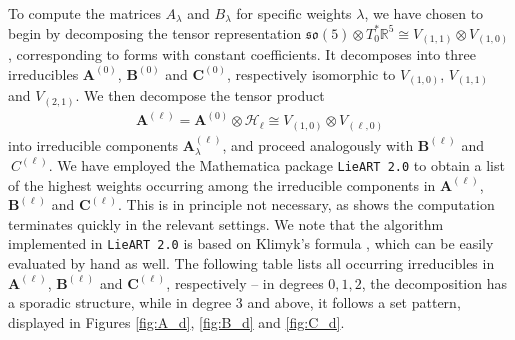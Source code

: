 \documentclass[11pt,reqno]{amsart}
\theoremstyle{remark}
\theoremstyle{definition}
\newcommand{\sov}{\mathfrak{so}(5)}
\begin{document}
To compute the matrices $A_\lambda$ and $B_\lambda$ for specific weights $\lambda$, we have chosen to begin by decomposing the tensor representation $\sov \otimes T_0^\ast \mathbb R^5 \cong V_{(1,1)} \otimes V_{(1,0)}$, corresponding to forms with constant coefficients. It decomposes into three irreducibles $\mathbf A^{(0)}$, $\mathbf B^{(0)}$ and $\mathbf C^{(0)}$, respectively isomorphic to $V_{(1,0)}$, $V_{(1,1)}$ and $V_{(2,1)}$. We then decompose the tensor product
\begin{align*}
    \mathbf A^{(\ell)} = \mathbf A^{(0)} \otimes \mathcal H_{\ell} \cong V_{(1,0)} \otimes V_{(\ell,0)}
\end{align*}
into irreducible components $\mathbf A^{(\ell)}_\lambda$, and proceed analogously with $\mathbf B^{(\ell)}$ and $\ C^{(\ell)}$. We have employed the Mathematica package \texttt{LieART 2.0} \cite{LieART} to obtain a list of the highest weights occurring among the irreducible components in $\mathbf A^{(\ell)}$, $\mathbf B^{(\ell)}$ and $\mathbf C^{(\ell)}$. This is in principle not necessary, as  shows the computation terminates quickly in the relevant settings. We note that the algorithm implemented in \texttt{LieART 2.0} is based on Klimyk's formula \cite[Section 5.4]{LieART}, which can be easily evaluated by hand as well. The following table lists all occurring irreducibles in $\mathbf A^{(\ell)}$, $\mathbf B^{(\ell)}$ and $\mathbf C^{(\ell)}$, respectively -- in degrees $0,1,2$, the decomposition has a sporadic structure, while in degree $3$ and above, it follows a set pattern, displayed in Figures \ref{fig:A_d}, \ref{fig:B_d} and \ref{fig:C_d}.
\end{document}
